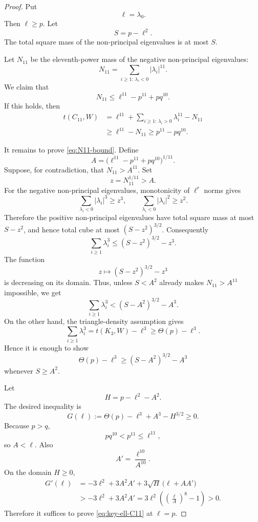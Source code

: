 \documentclass[11pt]{article}
\begin{document}
\begin{proof}
Put
\[
        \ell=\lambda_0.
\]
Then $\ell\ge p$.  Let
\[
        S=p-\ell^2.
\]
The total square mass of the non-principal eigenvalues is at most $S$.

Let $N_{11}$ be the eleventh-power mass of the negative non-principal eigenvalues:
\[
        N_{11}=\sum_{i\ge1:\,\lambda_i<0}|\lambda_i|^{11}.
\]
We claim that
\begin{equation}\label{eq:N11-bound}
        N_{11}\le \ell^{11}-p^{11}+pq^{10}.
\end{equation}
If this holds, then
\[
\begin{aligned}
        t(C_{11},W)
        &=\ell^{11}+\sum_{i\ge1:\,\lambda_i>0}\lambda_i^{11}-N_{11} \\
        &\ge \ell^{11}-N_{11}
         \ge p^{11}-pq^{10}.
\end{aligned}
\]

It remains to prove \eqref{eq:N11-bound}.  Define
\[
        A=\bigl(\ell^{11}-p^{11}+pq^{10}\bigr)^{1/11}.
\]
Suppose, for contradiction, that $N_{11}>A^{11}$.  Set
\[
        z=N_{11}^{1/11}>A.
\]
For the negative non-principal eigenvalues, monotonicity of $\ell^r$ norms gives
\[
        \sum_{\lambda_i<0}|\lambda_i|^3\ge z^3,
        \qquad
        \sum_{\lambda_i<0}|\lambda_i|^2\ge z^2.
\]
Therefore the positive non-principal eigenvalues have total square mass at most $S-z^2$, and hence total cube at most $(S-z^2)^{3/2}$.  Consequently
\[
        \sum_{i\ge1}\lambda_i^3
        \le (S-z^2)^{3/2}-z^3.
\]
The function
\[
        z\mapsto (S-z^2)^{3/2}-z^3
\]
is decreasing on its domain.  Thus, unless $S<A^2$ already makes $N_{11}>A^{11}$ impossible, we get
\[
        \sum_{i\ge1}\lambda_i^3
        < (S-A^2)^{3/2}-A^3.
\]
On the other hand, the triangle-density assumption gives
\[
        \sum_{i\ge1}\lambda_i^3=t(K_3,W)-\ell^3\ge \Theta(p)-\ell^3.
\]
Hence it is enough to show
\begin{equation}\label{eq:key-ell-C11}
        \Theta(p)-\ell^3
        \ge (S-A^2)^{3/2}-A^3
\end{equation}
whenever $S\ge A^2$.

Let
\[
        H=p-\ell^2-A^2.
\]
The desired inequality is
\[
        G(\ell):=\Theta(p)-\ell^3+A^3-H^{3/2}\ge0.
\]
Because $p>q$,
\[
        pq^{10}<p^{11}\le \ell^{11},
\]
so $A<\ell$.  Also
\[
        A'=\frac{\ell^{10}}{A^{10}}.
\]
On the domain $H\ge0$,
\[
\begin{aligned}
        G'(\ell)
        &=-3\ell^2+3A^2A'
          +3\sqrt H\,\bigl(\ell+AA'\bigr) \\
        &> -3\ell^2+3A^2A'
         =3\ell^2\left(\left(\frac{\ell}{A}\right)^8-1\right)>0.
\end{aligned}
\]
Therefore it suffices to prove \eqref{eq:key-ell-C11} at $\ell=p$.


\end{proof}
\end{document}
